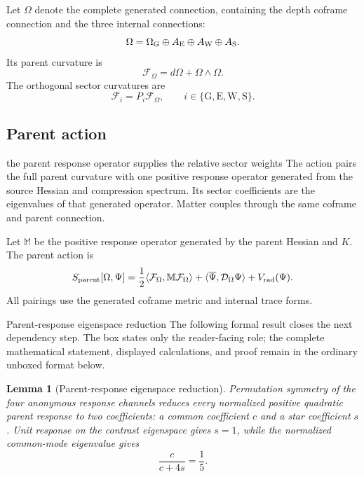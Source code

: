 \documentclass[11pt]{article}
\numberwithin{equation}{section}
\newtheorem{lemma}[definition]{Lemma}
\theoremstyle{remark}
\begin{document}
Let $\Omega$ denote the complete generated connection, containing the depth coframe connection and the three internal connections:
\begin{equation}
\Omega=\Omega_{\rm G}\oplus A_{\rm E}\oplus A_{\rm W}\oplus A_{\rm S}.
\end{equation}
Its parent curvature is
\begin{equation}
\mathcal F_\Omega=d\Omega+\Omega\wedge\Omega.
\end{equation}
The orthogonal sector curvatures are
\begin{equation}
\mathcal F_i=P_i\mathcal F_\Omega,
\qquad i\in\{\mathrm G,\mathrm E,\mathrm W,\mathrm S\}.
\end{equation}

\subsection{Parent action}
\begin{interpretivebridge}{the parent response operator supplies the relative sector weights}
The action pairs the full parent curvature with one positive response operator generated from the source Hessian and compression spectrum. Its sector coefficients are the eigenvalues of that generated operator. Matter couples through the same coframe and parent connection.
\end{interpretivebridge}

Let $\mathbb M$ be the positive response operator generated by the parent Hessian and $K$. The parent action is
\begin{equation}
S_{\rm parent}[\Omega,\Psi]
=\frac12\langle\mathcal F_\Omega,\mathbb M\mathcal F_\Omega\rangle
+\langle\overline\Psi,\mathcal D_\Omega\Psi\rangle
+V_{\rm rad}(\Psi).
\end{equation}
All pairings use the generated coframe metric and internal trace forms.

\begin{proofguide}{Parent-response eigenspace reduction}
The following formal result closes the next dependency step. The box states only the reader-facing role; the complete mathematical statement, displayed calculations, and proof remain in the ordinary unboxed format below.
\end{proofguide}
\begin{lemma}[Parent-response eigenspace reduction]
Permutation symmetry of the four anonymous response channels reduces every normalized positive quadratic parent response to two coefficients: a common coefficient $c$ and a star coefficient $s$.  Unit response on the contrast eigenspace gives $s=1$, while the normalized common-mode eigenvalue gives
\begin{equation}
\frac{c}{c+4s}=\frac15.
\label{eq:parent-eigen-reduction}
\end{equation}
\end{lemma}
\end{document}
